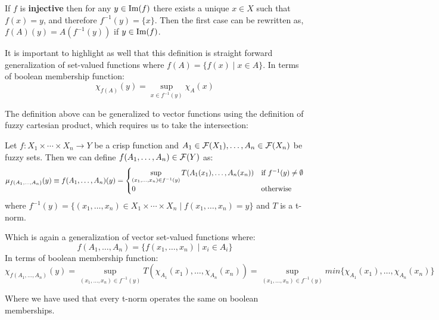 \begin{remark}
  If $f$ is \textbf{injective} then for any $y \in \textnormal{Im}(f)$ there exists a unique $x \in X$ such that $f(x)=y$, and therefore $f^{-1}(y)=\{x\}$. Then the first case can be rewritten as, $f(A)(y) = A(f^{-1}(y))$ if $y \in \textnormal{Im}(f)$.
\end{remark}

It is important to highlight as well that this definition is straight forward generalization of set-valued functions where $f(A)= \{f(x)\mid x\in A\}$. In terms of boolean membership function:
$$\chi _{f(A)}(y)=\sup_{x\in f^{-1}(y)}\chi_A(x)$$

The definition above can be generalized to vector functions using the definition of fuzzy cartesian product, which requires us to take the intersection:

\begin{definition}
  Let $f: X_1 \times \cdots \times X_n \longrightarrow Y$ be a crisp function and $A_1 \in \mathcal{F}(X_1), \ldots, A_n \in \mathcal{F}(X_n)$ be fuzzy sets. Then we can define $f(A_1,\ldots,A_n)\in \mathcal{F}(Y)$ as:
  \[
  \mu_{f(A_1,\ldots,A_n)}(y)\equiv f(A_1,\ldots,A_n)(y) = 
  \begin{cases}
    \sup_{(x_1,\ldots,x_n)\in f^{-1}(y)} T(A_1(x_1),\ldots,A_n(x_n)) & \textnormal{if } f^{-1}(y)\neq \emptyset\\
    0 & \textnormal{otherwise}
  \end{cases}
  \]
  where $f^{-1}(y)=\{(x_1,\ldots,x_n)\in X_1\times\cdots\times X_n \mid f(x_1,\ldots,x_n)=y\}$ and $T$ is a t-norm.
\end{definition}

Which is again a generalization of vector set-valued functions where: $$f(A_1,\ldots,A_n)= \{f(x_1,\ldots,x_n)\mid x_i\in A_i\}$$
In terms of boolean membership function:
$$\chi _{f(A_1,\ldots,A_n)}(y)=\sup_{(x_1,\ldots,x_n)\in f^{-1}(y)}T(\chi_{A_1}(x_1),\ldots,\chi_{A_n}(x_n)) = \sup_{(x_1,\ldots,x_n)\in f^{-1}(y)}min\{\chi_{A_1}(x_1),\ldots,\chi_{A_n}(x_n)\}$$

Where we have used that every t-norm operates the same on boolean memberships. 